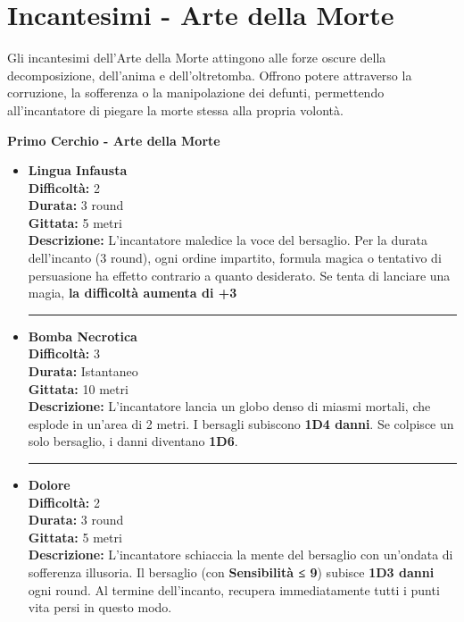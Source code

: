 \documentclass[./magie.tex]{subfiles}
\begin{document}
\section{Incantesimi - Arte della Morte}

Gli incantesimi dell'Arte della Morte attingono alle forze oscure della decomposizione, dell’anima e dell’oltretomba. Offrono potere attraverso la corruzione, la sofferenza o la manipolazione dei defunti, permettendo all'incantatore di piegare la morte stessa alla propria volontà.

\vspace{0.2cm}
{\zarafirtitlefont\Large\bfseries Primo Cerchio - Arte della Morte}

\begin{itemize}

\item \textbf{Lingua Infausta} \\
\textbf{Difficoltà:} 2 \\
\textbf{Durata:} 3 round \\
\textbf{Gittata:} 5 metri \\
\textbf{Descrizione:} L’incantatore maledice la voce del bersaglio. Per la durata dell’incanto (3 round), ogni ordine impartito, formula magica o tentativo di persuasione ha effetto contrario a quanto desiderato. Se tenta di lanciare una magia, \textbf{la difficoltà aumenta di +3}

\vspace{0.5cm}\rule{\textwidth}{0.4pt}\vspace{1cm}

\item \textbf{Bomba Necrotica} \\
\textbf{Difficoltà:} 3 \\
\textbf{Durata:} Istantaneo \\
\textbf{Gittata:} 10 metri \\
\textbf{Descrizione:} L'incantatore lancia un globo denso di miasmi mortali, che esplode in un’area di 2 metri. I bersagli subiscono \textbf{1D4 danni}. Se colpisce un solo bersaglio, i danni diventano \textbf{1D6}.

\vspace{0.5cm}\rule{\textwidth}{0.4pt}\vspace{1cm}
\clearpage
\item \textbf{Dolore} \\
\textbf{Difficoltà:} 2 \\
\textbf{Durata:} 3 round \\
\textbf{Gittata:} 5 metri \\
\textbf{Descrizione:} L’incantatore schiaccia la mente del bersaglio con un’ondata di sofferenza illusoria. Il bersaglio (con \textbf{Sensibilità ≤ 9}) subisce \textbf{1D3 danni} ogni round. Al termine dell’incanto, recupera immediatamente tutti i punti vita persi in questo modo.


\end{itemize}
\end{document}
